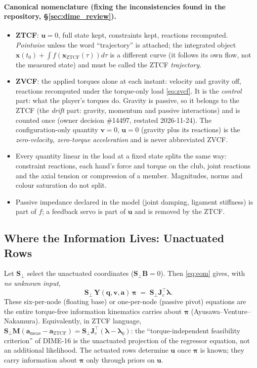 \documentclass[11pt,a4paper]{article}
\newcommand{\bq}{\mathbf{q}}
\newcommand{\bv}{\mathbf{v}}
\newcommand{\ba}{\mathbf{a}}
\newcommand{\bu}{\mathbf{u}}
\newcommand{\bx}{\mathbf{x}}
\newcommand{\bM}{\mathbf{M}}
\newcommand{\bY}{\mathbf{Y}}
\newcommand{\bB}{\mathbf{B}}
\newcommand{\bJ}{\mathbf{J}}
\newcommand{\bS}{\mathbf{S}}
\newcommand{\bpi}{\boldsymbol{\pi}}
\newcommand{\blambda}{\boldsymbol{\lambda}}
\begin{document}
\paragraph{Canonical nomenclature (fixing the inconsistencies found in the
repository, \S\ref{sec:dime_review}).}
\begin{itemize}[nosep]
  \item \textbf{ZTCF}: $\bu=0$, full state kept, constraints kept, reactions
    recomputed.  \emph{Pointwise} unless the word ``trajectory'' is attached;
    the integrated object $\bx(t_0)+\int f(\bx_{\mathrm{ZTCF}}(\tau))d\tau$ is a
    different curve (it follows its own flow, not the measured state) and must
    be called the ZTCF \emph{trajectory}.
  \item \textbf{ZVCF}: the applied torques alone at each instant: velocity
    and gravity off, reactions recomputed under the torque-only load
    \eqref{eq:zvcf}.  It is the \emph{control} part: what the player's torques
    do.  Gravity is passive, so it belongs to the ZTCF (the \emph{drift} part:
    gravity, momentum and passive interactions) and is counted once (owner
    decision \#14497, restated 2026-11-24).  The configuration-only quantity
    $\bv=0$, $\bu=0$ (gravity plus its reactions) is the \emph{zero-velocity,
    zero-torque acceleration} and is never abbreviated ZVCF.
  \item Every quantity linear in the load at a fixed state splits the same
    way: constraint reactions, each hand's force and torque on the club, joint
    reactions and the axial tension or compression of a member.  Magnitudes,
    norms and colour saturation do not split.
  \item Passive impedance declared in the model (joint damping, ligament
    stiffness) is part of $f$; a feedback servo is part of $\bu$ and is removed
    by the ZTCF.
\end{itemize}

\subsection{Where the Information Lives: Unactuated Rows}
\label{sec:unactuated}
Let $\bS_\perp$ select the unactuated coordinates ($\bS_\perp\bB=0$).  Then
\eqref{eq:eom} gives, with \emph{no unknown input},
\begin{equation}
  \bS_\perp\,\bY(\bq,\bv,\ba)\,\bpi \;=\; \bS_\perp\bJ_c^{\!\top}\blambda .
  \label{eq:unactuated}
\end{equation}
These six-per-node (floating base) or one-per-node (passive pivot) equations
are the entire torque-free information kinematics carries about $\bpi$
(Ayusawa--Venture--Nakamura).  Equivalently, in ZTCF language,
$\bS_\perp\bM(\ba_{\mathrm{meas}}-\ba_{\mathrm{ZTCF}})=\bS_\perp\bJ_c^{\!\top}(\blambda-\blambda_0)$:
the ``torque-independent feasibility criterion'' of DIME-16 is the unactuated
projection of the regressor equation, not an additional likelihood.
The actuated rows determine $\bu$ once $\bpi$ is known; they carry information
about $\bpi$ only through priors on $\bu$.
\end{document}
